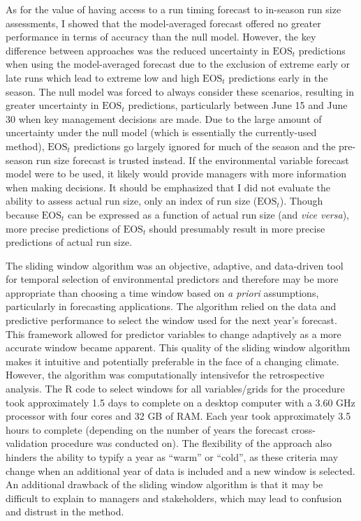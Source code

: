 \documentclass[12pt,]{book}
\theoremstyle{definition}
\theoremstyle{definition}
\theoremstyle{definition}
\theoremstyle{remark}
\begin{document}
As for the value of having access to a run timing forecast to in-season
run size assessments, I showed that the model-averaged forecast offered
no greater performance in terms of accuracy than the null model.
However, the key difference between approaches was the reduced
uncertainty in \(\text{EOS}_t\) predictions when using the
model-averaged forecast due to the exclusion of extreme early or late
runs which lead to extreme low and high \(\text{EOS}_t\) predictions
early in the season. The null model was forced to always consider these
scenarios, resulting in greater uncertainty in \(\text{EOS}_t\)
predictions, particularly between June 15 and June 30 when key
management decisions are made. Due to the large amount of uncertainty
under the null model (which is essentially the currently-used method),
\(\text{EOS}_t\) predictions go largely ignored for much of the season
and the pre-season run size forecast is trusted instead. If the
environmental variable forecast model were to be used, it likely would
provide managers with more information when making decisions. It should
be emphasized that I did not evaluate the ability to assess actual run
size, only an index of run size (\(\text{EOS}_t\)). Though because
\(\text{EOS}_t\) can be expressed as a function of actual run size (and
\emph{vice versa}), more precise predictions of \(\text{EOS}_t\) should
presumably result in more precise predictions of actual run size.

The sliding window algorithm was an objective, adaptive, and data-driven
tool for temporal selection of environmental predictors and therefore
may be more appropriate than choosing a time window based on \emph{a
priori} assumptions, particularly in forecasting applications. The
algorithm relied on the data and predictive performance to select the
window used for the next year's forecast. This framework allowed for
predictor variables to change adaptively as a more accurate window
became apparent. This quality of the sliding window algorithm makes it
intuitive and potentially preferable in the face of a changing climate.
However, the algorithm was computationally intensivefor the
retrospective analysis. The R code to select windows for all
variables/grids for the procedure took approximately 1.5 days to
complete on a desktop computer with a 3.60 GHz processor with four cores
and 32 GB of RAM. Each year took approximately 3.5 hours to complete
(depending on the number of years the forecast cross-validation
procedure was conducted on). The flexibility of the approach also
hinders the ability to typify a year as ``warm'' or ``cold'', as these
criteria may change when an additional year of data is included and a
new window is selected. An additional drawback of the sliding window
algorithm is that it may be difficult to explain to managers and
stakeholders, which may lead to confusion and distrust in the method.
\end{document}
